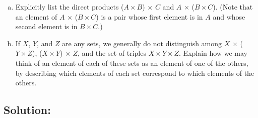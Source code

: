 \documentclass[12pt]{article}
\begin{document}
	\begin{enumerate}[(a)]
		\item Explicitly list the direct products ($A \times B$) $\times$ $C$ and $A$
			$\times$ ($B \times C$). (Note that an element of $A$ $\times$ ($B \times C$)
			is a pair whose first element is in $A$ and whose second element is in $B \times
			C$.)

		\item If $X$, $Y$, and $Z$ are any sets, we generally do not distinguish
			among $X$ $\times$ ($Y \times Z$), ($X \times Y$) $\times$ $Z$, and the
			set of triples $X \times Y \times Z$. Explain how we may think of an element
			of each of these sets as an element of one of the others, by describing
			which elements of each set correspond to which elements of the others.
	\end{enumerate}

	\medskip

	\subsection*{\textbf{Solution:}}
\end{document}
